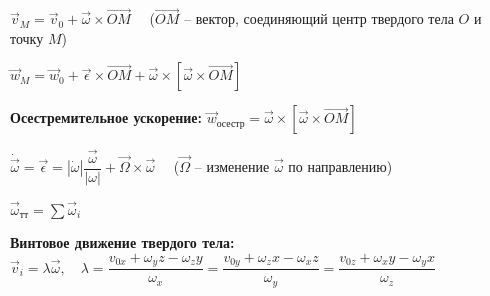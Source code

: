 
\begin{itemize*}
  \item \(\vec{v}_M = \vec{v}_0 + \vec{\omega} \times \overrightarrow{OM} \quad\)
  (\(\overrightarrow{OM}\) \--- вектор, соединяющий центр твердого тела \(O\) и точку
  \(M\)) \\

  \item \(\vec{w}_M = \vec{w}_0 + \vec{\epsilon} \times \overrightarrow{OM} + \vec{\omega}
  \times \left[\vec{\omega} \times \overrightarrow{OM}\right] \) \\

  \item \textbf{Осестремительное ускорение:} \(\vec{w}_\text{осестр} = \vec{\omega} \times
  \left[\vec{\omega} \times \overrightarrow{OM}\right]\)
\end{itemize*}


\begin{itemize*}
  \item \(\dot{\vec{\omega}} = \vec{\epsilon} = |\dot{\omega}|\dfrac{\vec{\omega}}{|\omega|} +
  \vec{\Omega} \times \vec{\omega} \quad\) (\(\vec{\Omega}\) \--- изменение \(\vec{\omega}\)
  по направлению) \\

  \item \(\vec{\omega}_\text{тт} = \sum{\vec{\omega}_i}\) \\

  \item \textbf{Винтовое движение твердого тела:} \(\vec{v}_i = \lambda\vec{\omega}, \quad
  \lambda = \dfrac{v_{0x} + \omega_yz - \omega_zy}{\omega_x} = \dfrac{v_{0y} + \omega_zx -
  \omega_xz}{\omega_y} = \dfrac{v_{0z} + \omega_xy - \omega_yx}{\omega_z}\) \\
\end{itemize*}


